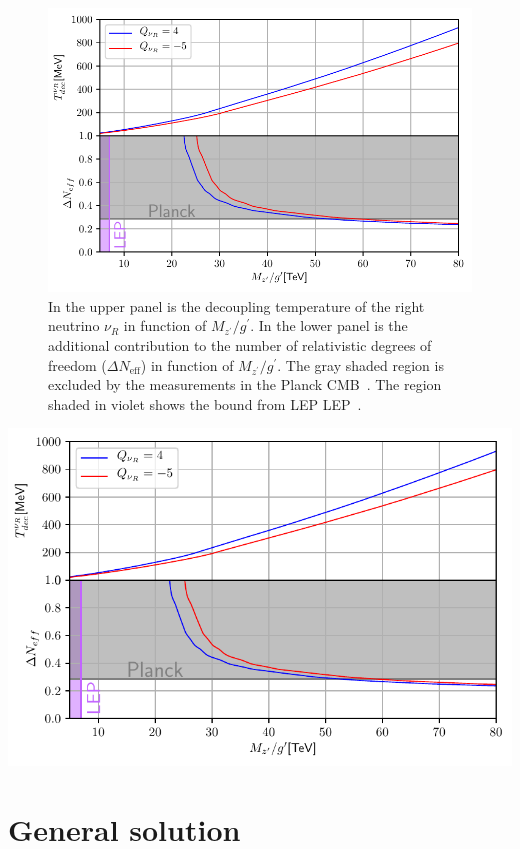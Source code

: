 \documentclass[12pt]{article}
\begin{document}
%
\begin{figure}
\centering
\includegraphics[scale=0.8]{DeltaNeff.pdf}
\caption{In the upper panel is the decoupling temperature of the right neutrino $\nu_{R}$ in function of $M_{z^{\prime}}/g^{\prime}$. In the lower panel is the additional contribution to the number of relativistic degrees of freedom ($\Delta N_{\text{eff}}$) in function of $M_{z^{\prime}}/g^{\prime}$. The gray shaded region is excluded by the measurements in the Planck CMB~\cite{Aghanim:2018eyx}. The region shaded in violet shows the bound from LEP  LEP~\cite{Alioli:2017nzr}.}
\label{fig:Neff}
\end{figure}
%




\includegraphics[scale=0.9]{DeltaNeff.pdf}


\appendix

\section{General solution}
\end{document}
